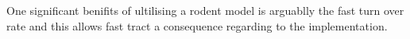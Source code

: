 One significant benifits of ultilising a rodent model is arguablly the fast turn over rate and this allows fast tract a consequence regarding to the implementation. \cite{Vandamme_2014}